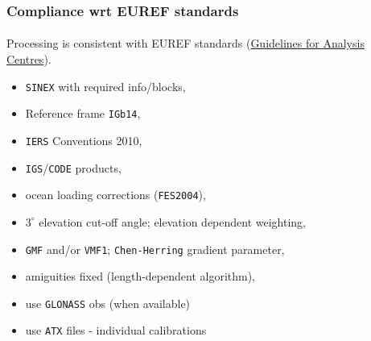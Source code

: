 \begin{frame}\frametitle{Compliance wrt EUREF standards}\framesubtitle{}
\vskip-1cm
  Processing is consistent with EUREF standards (\href{http://www.epncb.oma.be/_documentation/guidelines/guidelines_analysis_centres.pdf}{Guidelines for Analysis Centres}).
  \begin{itemize}%
    \item \texttt{SINEX} with required info/blocks,
    \item Reference frame \texttt{IGb14},
    \item \texttt{IERS} Conventions 2010,
    \item \texttt{IGS}/\texttt{CODE} products,
    \item ocean loading corrections (\texttt{FES2004}),
    \item $3^{\circ}$ elevation cut-off angle; elevation dependent weighting,
    \item \texttt{GMF} and/or \texttt{VMF1}; \texttt{Chen-Herring} gradient parameter,
    \item amiguities fixed (length-dependent algorithm),
    \item use \texttt{GLONASS} obs (when available)
    \item use \texttt{ATX} files - individual calibrations
  \end{itemize}
\end{frame}


